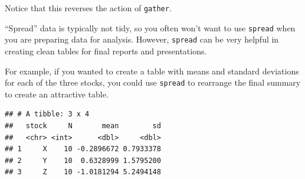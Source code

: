 \documentclass[]{book}
\makeatletter
\newenvironment{Shaded}{\begin{snugshade}}{\end{snugshade}}
\newcommand{\KeywordTok}[1]{\textcolor[rgb]{0.13,0.29,0.53}{\textbf{#1}}}
\newcommand{\DataTypeTok}[1]{\textcolor[rgb]{0.13,0.29,0.53}{#1}}
\newcommand{\DecValTok}[1]{\textcolor[rgb]{0.00,0.00,0.81}{#1}}
\newcommand{\StringTok}[1]{\textcolor[rgb]{0.31,0.60,0.02}{#1}}
\newcommand{\OperatorTok}[1]{\textcolor[rgb]{0.81,0.36,0.00}{\textbf{#1}}}
\newcommand{\NormalTok}[1]{#1}
\newenvironment{kframe}{%
\medskip{}
\setlength{\fboxsep}{.8em}
 \def\at@end@of@kframe{}%
 \ifinner\ifhmode%
  \def\at@end@of@kframe{\end{minipage}}%
  \begin{minipage}{\columnwidth}%
 \fi\fi%
 \def\FrameCommand##1{\hskip\@totalleftmargin \hskip-\fboxsep
 \colorbox{shadecolor}{##1}\hskip-\fboxsep
     \hskip-\linewidth \hskip-\@totalleftmargin \hskip\columnwidth}%
 \MakeFramed {\advance\hsize-\width
   \@totalleftmargin\z@ \linewidth\hsize
   \@setminipage}}%
 {\par\unskip\endMakeFramed%
 \at@end@of@kframe}
\renewenvironment{Shaded}{\begin{kframe}}{\end{kframe}}
\theoremstyle{definition}
\theoremstyle{definition}
\theoremstyle{definition}
\theoremstyle{remark}
\makeatother
\begin{document}
Notice that this reverses the action of \texttt{gather}.

``Spread'' data is typically not tidy, so you often won't want to use
\texttt{spread} when you are preparing data for analysis. However,
\texttt{spread} can be very helpful in creating clean tables for final
reports and presentations.

For example, if you wanted to create a table with means and standard
deviations for each of the three stocks, you could use \texttt{spread}
to rearrange the final summary to create an attractive table.

\begin{Shaded}
\end{Shaded}

\begin{verbatim}
## # A tibble: 3 x 4
##   stock     N       mean        sd
##   <chr> <int>      <dbl>     <dbl>
## 1     X    10 -0.2896672 0.7933378
## 2     Y    10  0.6328999 1.5795200
## 3     Z    10 -1.0181294 5.2494148
\end{verbatim}

\begin{Shaded}
\end{Shaded}
\end{document}
